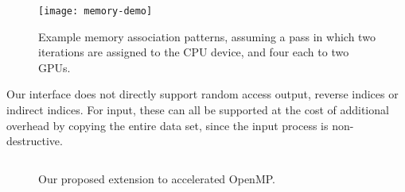 \begin{figure}
  \centering
  \texttt{[image: memory-demo]}
  \caption{Example memory association patterns, assuming a pass in which two
    iterations are assigned to the CPU device, and four each to two
    GPUs.\label{fig:memory-demo}}
\end{figure}





Our interface does not directly support random access output, reverse indices
or indirect indices. For input, these can all be supported at the cost of
additional overhead by copying the entire data set, since the input process
is non-destructive.


\begin{figure}[t]
  \centering
  \begin{minipage}[b]{\columnwidth}
    \inputminted[fontsize=\scriptsize,frame=single]{c}{snippets/auto.c}
  \end{minipage}
  \caption{Our proposed extension to accelerated OpenMP.\label{fig:ctsar-ext}}
\end{figure}


